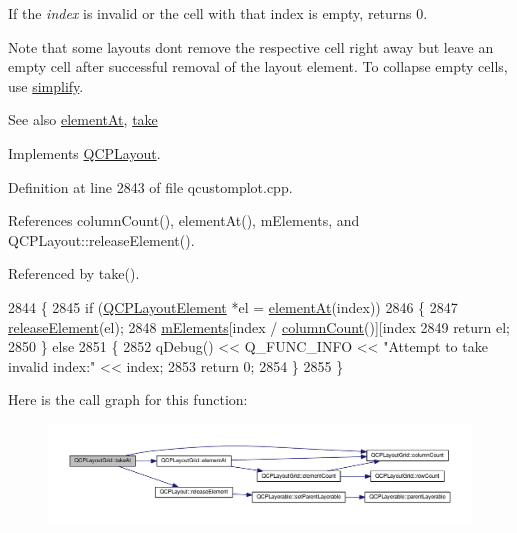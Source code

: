 If the {\itshape index} is invalid or the cell with that index is empty, returns 0.

Note that some layouts don\textquotesingle{}t remove the respective cell right away but leave an empty cell after successful removal of the layout element. To collapse empty cells, use \hyperlink{class_q_c_p_layout_grid_a08bba60e4acd20165526a8fd7f986b58}{simplify}.

\begin{DoxySeeAlso}{See also}
\hyperlink{class_q_c_p_layout_grid_a26849ee5c47b4c940e8d65e8462f1065}{element\+At}, \hyperlink{class_q_c_p_layout_grid_a666a9fe9e92054436f9b66eba25cca0c}{take} 
\end{DoxySeeAlso}


Implements \hyperlink{class_q_c_p_layout_a5a79621fa0a6eabb8b520cfc04fb601a}{Q\+C\+P\+Layout}.



Definition at line 2843 of file qcustomplot.\+cpp.



References column\+Count(), element\+At(), m\+Elements, and Q\+C\+P\+Layout\+::release\+Element().



Referenced by take().


\begin{DoxyCode}
2844 \{
2845   \textcolor{keywordflow}{if} (\hyperlink{class_q_c_p_layout_element}{QCPLayoutElement} *el = \hyperlink{class_q_c_p_layout_grid_a26849ee5c47b4c940e8d65e8462f1065}{elementAt}(index))
2846   \{
2847     \hyperlink{class_q_c_p_layout_a4afbb4bef0071f72f91afdac4433a18e}{releaseElement}(el);
2848     \hyperlink{class_q_c_p_layout_grid_a3577d3855bf8ad20ef9079291a49f397}{mElements}[index / \hyperlink{class_q_c_p_layout_grid_ac39074eafd148b82d0762090f258189e}{columnCount}()][index %
2849     \textcolor{keywordflow}{return} el;
2850   \} \textcolor{keywordflow}{else}
2851   \{
2852     qDebug() << Q\_FUNC\_INFO << \textcolor{stringliteral}{"Attempt to take invalid index:"} << index;
2853     \textcolor{keywordflow}{return} 0;
2854   \}
2855 \}
\end{DoxyCode}


Here is the call graph for this function\+:\nopagebreak
\begin{figure}[H]
\begin{center}
\leavevmode
\includegraphics[width=350pt]{class_q_c_p_layout_grid_acc1277394ff8a6432e111ff9463e6375_cgraph}
\end{center}
\end{figure}




